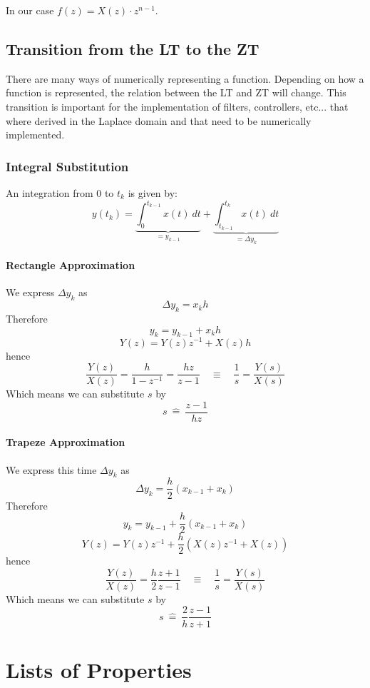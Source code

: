 \documentclass[10pt,a4paper]{article}
\begin{document}
In our case $f(z) = X(z)\cdot z^{n-1}$.

\subsection{Transition from the LT to the ZT}
There are many ways of numerically representing a function. Depending on how a function is represented, the relation between the LT and ZT will change. This transition is important for the implementation of filters, controllers, etc... that where derived in the Laplace domain and that need to be numerically implemented. 

\subsubsection{Integral Substitution}
An integration from $0$ to $t_k$ is given by:
$$
y(t_k) = \underbrace{\int_{0}^{t_{k-1}} x(t) \: dt}_{=y_{k-1}} + \underbrace{\int_{t_{k-1}}^{t_{k}} x(t) \: dt}_{= \Delta y_k}
$$
\paragraph{Rectangle Approximation}
We express $\Delta y_k$ as 
$$
\Delta y_k = x_k h
$$
Therefore $$ y_k = y_{k-1} + x_k h $$
$$ Y(z) = Y(z)z^{-1} + X(z)h $$
hence
$$
\frac{Y(z)}{X(z)} = \frac{h}{1-z^{-1}} = \frac{hz}{z-1} \quad \equiv \quad \frac{1}{s} = \frac{Y(s)}{X(s)}
$$
Which means we can substitute $s$ by
$$
\boxed{
s \: \hat{=} \: \frac{z-1}{hz}
}
$$

\paragraph{Trapeze Approximation}
We express this time $\Delta y_k$ as 
$$
\Delta y_k = \frac{h}{2}(x_{k-1} + x_k)
$$
Therefore
$$
y_k = y_{k-1} + \frac{h}{2}(x_{k-1} + x_k)
$$
$$
Y(z) = Y(z)z^{-1} + \frac{h}{2}(X(z)z^{-1} + X(z))
$$
hence
$$
\frac{Y(z)}{X(z)} = \frac{h}{2} \frac{z+1}{z-1} \quad \equiv \quad \frac{1}{s} = \frac{Y(s)}{X(s)}
$$
Which means we can substitute $s$ by
$$
\boxed{
s \: \hat{=} \: \frac{2}{h} \frac{z-1}{z+1}
}
$$

\newpage
\section{Lists of Properties}
\end{document}
